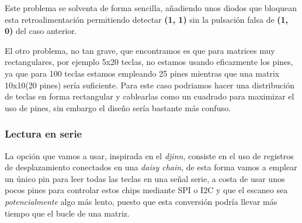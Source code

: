     Este problema se solventa de forma sencilla, añadiendo unos diodos que bloquean esta retroalimentación permitiendo detectar \textbf{(1, 1)} sin la pulsación falsa de \textbf{(1, 0)} del caso anterior.

    El otro problema, no tan grave, que encontramos es que para matrices muy rectangulares, por ejemplo 5x20 teclas, no estamos usando eficazmente los pines, ya que para 100 teclas estamos empleando 25 pines mientras que una matrix 10x10(20 pines) sería suficiente. Para este caso podriamos hacer una distribución de teclas en forma rectangular y cablearlas como un cuadrado para maximizar el uso de pines, sin embargo el diseño sería bastante más confuso.

    \subsubsection{Lectura en serie}
    La opción que vamos a usar, inspirada en el \textit{djinn}\cite{djinn}, consiste en el uso de registros de desplazamiento conectados en una \textit{daisy chain}\cite{daisy}, de esta forma vamos a emplear un único pin para leer todas las teclas en una señal serie, a costa de usar unos pocos pines para controlar estos chips mediante SPI\cite{spi} o I2C\cite{i2c} y que el escaneo sea \textit{potencialmente} algo más lento, puesto que esta conversión podría llevar más tiempo que el bucle de una matriz.